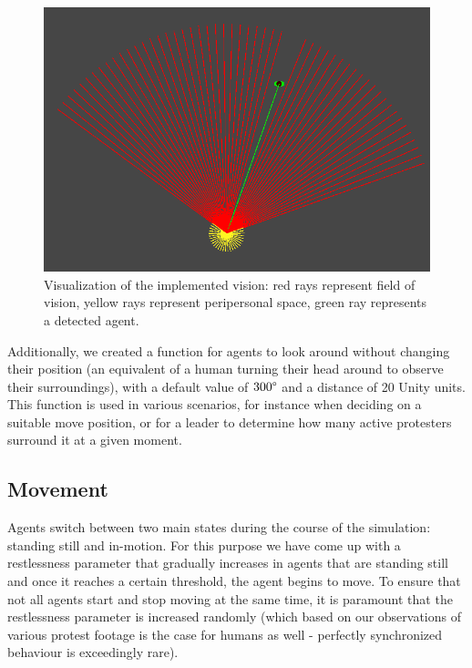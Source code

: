 \documentclass[9pt]{pnas-new}
\begin{document}
\begin{figure}[H]
\centering
\includegraphics[width=0.95\columnwidth]{vision.png}
\caption{Visualization of the implemented vision: red rays represent field of vision, yellow rays represent peripersonal space, green ray represents a detected agent.}
\label{vision}
\end{figure}

Additionally, we created a function for agents to look around without changing their position (an equivalent of a human turning their head around to observe their surroundings), with a default value of \begin{math}300\degree\end{math} and a distance of 20 Unity units. This function is used in various scenarios, for instance when deciding on a suitable move position, or for a leader to determine how many active protesters surround it at a given moment. 

\subsection*{Movement}

Agents switch between two main states during the course of the simulation: standing still and in-motion. For this purpose we have come up with a restlessness parameter that gradually increases in agents that are standing still and once it reaches a certain threshold, the agent begins to move. To ensure that not all agents start and stop moving at the same time, it is paramount that the restlessness parameter is increased randomly (which based on our observations of various protest footage is the case for humans as well - perfectly synchronized behaviour is exceedingly rare). 
\end{document}
